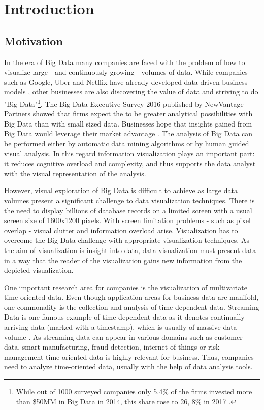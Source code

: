 \chapter{Introduction}
\label{chap:introduction}

\section{Motivation}
In the era of Big Data many companies are faced with the problem of how to visualize large - and continuously growing - volumes of data. While companies such as Google,  Uber and Netflix have already developed data-driven business models \cite{Ryan2016}, other businesses are also discovering the value of data and striving to do "Big Data"\footnote{While out of 1000 surveyed companies only 5.4\% of the firms invested more than \$50MM in Big Data in 2014,  this share rose to 26, 8\% in 2017  \cite{Bean2016}.}. The Big Data Executive Survey 2016 published by NewVantage Partners showed that firms expect the to be greater analytical possibilities with Big Data than with small sized data. Businesses hope that insights gained from Big Data would leverage their market advantage  \cite{Bean2016}. The analysis of Big Data can be performed either by automatic data mining algorithms or by human guided visual analysis. In this regard information visualization plays an important part: it reduces cognitive overload and complexity, and thus supports the data analyst with the visual representation of the analysis.
\par
 However,  visual exploration of Big Data is difficult to achieve as large data volumes present a significant challenge to data visualization techniques. There is the need to display billions of database records on a limited screen with a usual screen size of 1600x1200 pixels. With screen limitation problems - such as pixel overlap - visual clutter and information overload arise. Visualization has to overcome the Big Data challenge with appropriate visualization techniques. As the aim of visualization is insight into data,  data visualization must present data in a way that the reader of the visualization gains new information from the depicted visualization.
\par
One important research area for companies is the visualization of multivariate time-oriented data. Even though application areas for business data are manifold, one commonality is the collection and analysis of time-dependent data. Streaming Data is one famous example of time-dependent data as it denotes continually arriving data (marked with a timestamp), which is usually of massive data volume  \cite{Callaghan2002}. As streaming data can appear in various domains such as customer data,  smart manufacturing,  fraud detection,  internet of things or risk management time-oriented data is highly relevant for business. Thus,  companies need to analyze time-oriented data,  usually with the help of data analysis tools. 
